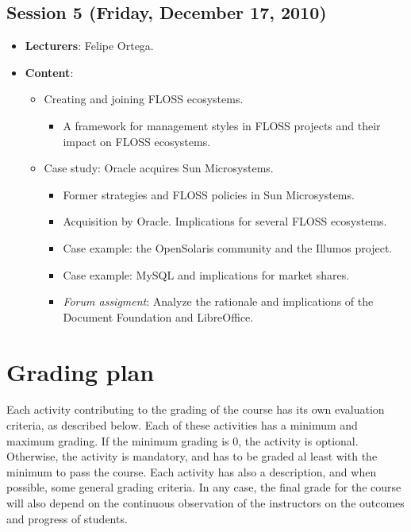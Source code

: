 \documentclass[a4paper]{article}
\begin{document}
\subsection{Session 5 (Friday, December 17, 2010)}

\begin{itemize}
 \item \textbf{Lecturers}: Felipe Ortega.

 \item \textbf{Content}:

    \begin{itemize}
     \item Creating and joining FLOSS ecosystems.
	\begin{itemize}
	 \item A framework for management styles in FLOSS projects and their impact on FLOSS ecosystems.
	\end{itemize}

     \item Case study: Oracle acquires Sun Microsystems.
	\begin{itemize}
	 \item Former strategies and FLOSS policies in Sun Microsystems.
	 \item Acquisition by Oracle. Implications for several FLOSS ecosystems.
	 \item Case example: the OpenSolaris community and the Illumos project.
	 \item Case example: MySQL and implications for market shares.
	 \item \textit{Forum assigment}: Analyze the rationale and implications of the Document Foundation and LibreOffice.
	\end{itemize}

    \end{itemize}

\end{itemize}

\section{Grading plan}

Each activity contributing to the grading of the course has its own evaluation criteria, as described below. Each of these activities has a minimum and maximum grading. If the minimum grading is 0, the activity is optional. Otherwise, the activity is mandatory, and has to be graded al least with the minimum to pass the course. Each activity has also a description, and when possible, some general grading criteria. In any case, the final grade for the course will also depend on the continuous observation of the instructors on the outcomes and progress of students.
\end{document}
